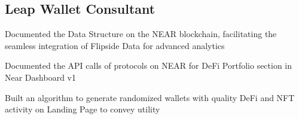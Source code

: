 
\subsection*{Leap Wallet \hfill Consultant} 
    \begin{zitemize}
        \item Documented the  Data Structure on the NEAR blockchain, facilitating the seamless integration of Flipside Data for advanced analytics
        \item Documented the API calls of protocols on NEAR for DeFi Portfolio section in Near Dashboard v1
        \item Built an algorithm to generate randomized wallets with quality DeFi and NFT activity on Landing Page to convey utility
    \end{zitemize}
    